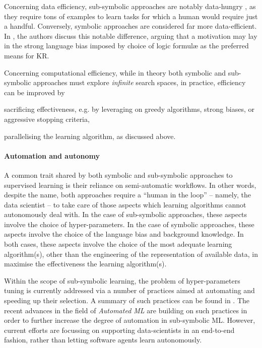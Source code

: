\documentclass[12pt,a4paper,openright,twoside]{book}
\begin{document}
Concerning data efficiency, sub-symbolic approaches are notably data-hungry \cite{Adadi21}, as they require tons of examples to learn tasks for which a human would require just a handful.
%
Conversely, symbolic approaches are considered far more data-efficient.
%
In \cite{EvansG18}, the authors discuss this notable difference, arguing that a motivation may lay in the strong language bias imposed by choice of logic formul\ae{} as the preferred means for KR.

Concerning computational efficiency, while in theory both symbolic and sub-symbolic approaches must explore \emph{infinite} search spaces, in practice, efficiency can be improved by
%
\begin{inlinelist}
    \item sacrificing effectiveness, e.g. by leveraging on greedy algorithms, strong biases, or aggressive stopping criteria,
    \item parallelising the learning algorithm, as discussed above.
\end{inlinelist}


\paragraph{Automation and autonomy}


A common trait shared by both symbolic and sub-symbolic approaches to supervised learning is their reliance on semi-automatic workflows.
%
In other words, despite the name, both approaches require a ``human in the loop'' -- namely, the data scientist -- to take care of those aspects which learning algorithms cannot autonomously deal with.
%
In the case of sub-symbolic approaches, these aspects involve the choice of hyper-parameters.
%
In the case of symbolic approaches, these aspects involve the choice of the language bias and background knowledge.
%
In both cases, these aspects involve the choice of the most adequate learning algorithm(s), other than the engineering of the representation of available data, in maximise the effectiveness the learning algorithm(s).

Within the scope of sub-symbolic learning, the problem of hyper-parameters tuning is currently addressed via a number of practices aimed at automating and speeding up their selection.
%
A summary of such practices can be found in \cite{ClaesenM15}.
%
The recent advances in the field of \emph{Automated ML} \cite{HeZC21} are building on such practices in order to further increase the degree of automation in sub-symbolic ML.
%
However, current efforts are focussing on supporting data-scientists in an end-to-end fashion, rather than letting software agents learn autonomously.
\end{document}
